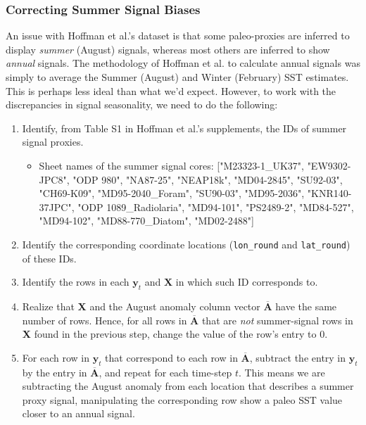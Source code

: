 \documentclass{article}
\begin{document}

\subsubsection{Correcting Summer Signal Biases}
An issue with Hoffman et al.'s dataset is that some paleo-proxies are inferred to display \textit{summer} (August) signals, whereas most others are inferred to show \textit{annual} signals. The methodology of Hoffman et al. to calculate annual signals was simply to average the Summer (August) and Winter (February) SST estimates. This is perhaps less ideal than what we'd expect. However, to work with the discrepancies in signal seasonality, we need to do the following:
\begin{enumerate}
    \item Identify, from Table S1 in Hoffman et al.'s supplements, the IDs of summer signal proxies.
        \begin{itemize}
            \item Sheet names of the summer signal cores: ["M23323-1\_UK37", "EW9302-JPC8", "ODP 980", "NA87-25", "NEAP18k", "MD04-2845", "SU92-03", "CH69-K09", "MD95-2040\_Foram", "SU90-03",  "MD95-2036", "KNR140-37JPC", "ODP 1089\_Radiolaria", "MD94-101", "PS2489-2", "MD84-527", "MD94-102", "MD88-770\_Diatom", "MD02-2488"]
        \end{itemize}

    \item Identify the corresponding coordinate locations (\texttt{lon\_round} and \texttt{lat\_round}) of these IDs.
    \item Identify the rows in each $\textbf{y}_t$ and $\textbf{X}$ in which such ID corresponds to.
    \item Realize that \textbf{X} and the August anomaly column vector $\overline{\textbf{A}}$ have the same number of rows. Hence, for all rows in $\overline{\textbf{A}}$ that are \textit{not} summer-signal rows in \textbf{X} found in the previous step, change the value of the row's entry to $0$.
    \item For each row in $\textbf{y}_t$ that correspond to each row in $\overline{\textbf{A}}$, subtract the entry in $\textbf{y}_t$ by the entry in $\overline{\textbf{A}}$, and repeat for each time-step $t$. This means we are subtracting the August anomaly from each location that describes a summer proxy signal, manipulating the corresponding row show a paleo SST value closer to an annual signal.
\end{enumerate}
\end{document}
